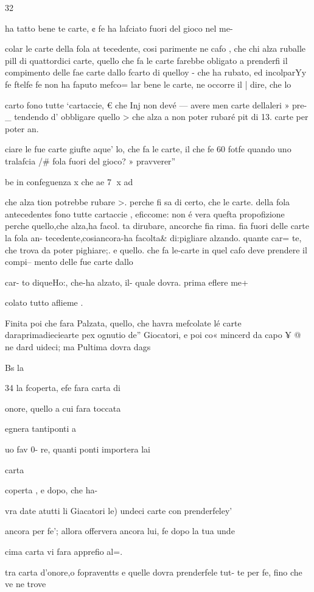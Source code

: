 {{{{{{{{{{{{{{{{{{{{ 

 

 

 

32

ha tatto bene te carte, ¢ fe ha
lafciato fuori del gioco nel me-
{colar le carte della fola at
tecedente, cosi parimente ne
cafo , che chi alza ruballe pill di
quattordici carte, quello che fa
le carte farebbe obligato a
prenderfi il compimento delle
fae carte dallo fcarto di quelloy -
che ha rubato, ed incolparYy
fe ftelfe fe non ha faputo mefco=
lar bene le carte, ne occorre il |
dire, che lo {carto fono tutte
‘cartaccie, € che Inj non devé —
avere men carte dellaleri » pre-_
tendendo d’ obbligare quello >
che alza a non poter rubaré
pit di 13. carte per poter an.
{ciare le fue carte giufte aque’
lo, che fa le carte, il che fe 60%
fotfe quando uno tralafcia /#
fola fuori del gioco? » pravverer”

be in confeguenza x che ae 7
x ad

che alza tion potrebbe rubare >.
perche fi sa di certo, che le
carte. della fola antecedentes
fono tutte cartaccie , eficcome:
non é vera quefta propofizione
perche quello,che alza,ha facol.
ta dirubare, ancorche fia rima.
fia fuori delle carte la fola an-
tecedente,cosiancora-ha facolta&
di:pigliare alzando. quante car=
te, che trova da poter pighiare;.
e quello. che fa le-carte in quel
cafo deve prendere il compi--
mento delle fue carte dallo {car-
to diqueHo:, che-ha alzato, il-
quale dovra. prima eflere me+
{colato tutto aflieme .

Finita poi che fara Palzata,
quello, che havra mefcolate lé
carte daraprimadieciearte pex
ognutio de” Giocatori, e poi co«
mincerd da capo ¥ @ ne dard
uideci; ma Pultima dovra dags

Bs la

 
 

34
la fcoperta, efe fara carta di

onore, quello a cui fara toccata

{egnera tantiponti a {uo fav 0-
re, quanti ponti importera lai

carta {coperta , e dopo, che ha-

vra date atutti li Giacatori le)
undeci carte con prenderfeley’

ancora per fe’; allora offervera
ancora lui, fe dopo la tua unde

cima carta vi fara apprefio al=.

tra carta d’onore,o fopraventts
e quelle dovra prenderfele tut-
te per fe, fino che ve ne trove

}}}}}}}}}}}}}}}}}}}}}}}}}}}}

